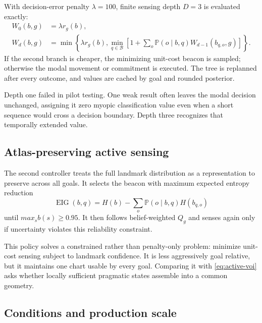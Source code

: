 \documentclass[11pt]{article}
\newcommand{\Prob}{\mathbb P}
\begin{document}
With decision-error penalty $\lambda=100$, finite sensing depth $D=3$ is
evaluated exactly:
\begin{align}
 W_0(b,g)&=\lambda r_g(b),\\
 W_d(b,g)&=\min\left\{\lambda r_g(b),
 \min_{q\in\mathcal B}\left[
 1+\sum_o\Prob(o\mid b,q)W_{d-1}(b_{q,o},g)
 \right]\right\}.
 \label{eq:active-voi}
\end{align}
If the second branch is cheaper, the minimizing unit-cost beacon is sampled;
otherwise the modal movement or commitment is executed. The tree is replanned
after every outcome, and values are cached by goal and rounded posterior.

Depth one failed in pilot testing. One weak result often leaves the modal
decision unchanged, assigning it zero myopic classification value even when a
short sequence would cross a decision boundary. Depth three recognizes that
temporally extended value.

\subsection{Atlas-preserving active sensing}

The second controller treats the full landmark distribution as a representation
to preserve across all goals. It selects the beacon with maximum expected
entropy reduction
\begin{equation}
 \operatorname{EIG}(b,q)=H(b)-
 \sum_o\Prob(o\mid b,q)H(b_{q,o})
 \label{eq:active-eig}
\end{equation}
until $max_sb(s)\ge0.95$. It then follows belief-weighted $Q_g$ and senses
again only if uncertainty violates this reliability constraint.

This policy solves a constrained rather than penalty-only problem: minimize
unit-cost sensing subject to landmark confidence. It is less aggressively goal
relative, but it maintains one chart usable by every goal. Comparing it with
\cref{eq:active-voi} asks whether locally sufficient pragmatic states assemble
into a common geometry.

\subsection{Conditions and production scale}
\end{document}
